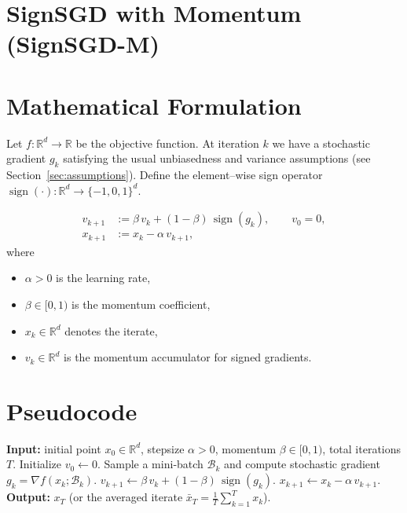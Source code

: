 \documentclass{article}
\newcommand{\sign}{\operatorname{sign}}
\newcommand{\R}{\mathbb{R}}
\begin{document}
\section*{SignSGD with Momentum (SignSGD-M)}

\section*{Mathematical Formulation}
Let $f:\R^{d}\rightarrow\R$ be the objective function.  
At iteration $k$ we have a stochastic gradient $g_{k}$ satisfying the usual unbiasedness and variance assumptions (see Section~\ref{sec:assumptions}).  
Define the element–wise sign operator $\sign(\cdot):\R^{d}\rightarrow\{-1,0,1\}^{d}$.  

\[
\boxed{
\begin{aligned}
v_{k+1} &:= \beta\,v_{k} + (1-\beta)\,\sign(g_{k}),  \qquad v_{0}=0,\\[4pt]
x_{k+1} &:= x_{k} - \alpha\, v_{k+1},
\end{aligned}}
\]
where 
\begin{itemize}
  \item $\alpha>0$ is the learning rate,
  \item $\beta\in[0,1)$ is the momentum coefficient,
  \item $x_{k}\in\R^{d}$ denotes the iterate,
  \item $v_{k}\in\R^{d}$ is the momentum accumulator for signed gradients.
\end{itemize}

\section*{Pseudocode}
\begin{algorithm}[H]
\caption{SignSGD with Momentum}
\label{alg:signsgd-m}
\begin{algorithmic}[1]
\State \textbf{Input:} initial point $x_{0}\in\R^{d}$, stepsize $\alpha>0$, momentum $\beta\in[0,1)$, total iterations $T$.
\State Initialize $v_{0}\gets 0$.
    \State Sample a mini‑batch $\mathcal{B}_{k}$ and compute stochastic gradient 
    $g_{k}= \nabla f(x_{k};\mathcal{B}_{k})$.
    \State $v_{k+1}\gets \beta\,v_{k}+(1-\beta)\,\sign(g_{k})$.
    \State $x_{k+1}\gets x_{k}-\alpha\,v_{k+1}$.
\EndFor
\State \textbf{Output:} $x_{T}$ (or the averaged iterate $\bar x_{T}= \frac1T\sum_{k=1}^{T}x_{k}$).
\end{algorithmic}
\end{algorithm}
\end{document}
